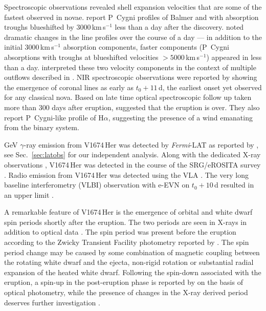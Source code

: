 \documentclass[a4paper,fleqn,usenatbib]{mnras}
\newcommand{\nova}{V1674\,Her}
\newcommand{\fermilat}{\emph{Fermi}-LAT}
\begin{document}
Spectroscopic observations revealed shell expansion velocities that are some of the fastest observed in novae. 
\citet{2021ATel14704....1M} report P~Cygni profiles of Balmer and 
 with absorption troughs blueshifted by 3000\,km\,s$^{-1}$ less than a day after the discovery. 
\citet{2021ATel14710....1A} noted dramatic changes in the line profiles over the course of a day --- in addition to 
the initial 3000\,km\,s$^{-1}$ absorption components, faster components (P~Cygni absorptions with troughs at blueshifted 
velocities $>5000$\,km\,s$^{-1}$) appeared in less than a day. 
\citet{2021ATel14710....1A} interpreted these two velocity components in the context of multiple outflows described in \citet{2020ApJ...905...62A}. 
NIR spectroscopic observations were reported by \cite{2021ApJ...922L..10W} showing the emergence of coronal lines as early
as $t_0 + 11$\,d, the earliest onset yet observed for any classical nova. 
Based on late time optical spectroscopic follow up taken more than 300 days after eruption, 
\cite{2022RNAAS...6..124W} suggested that the eruption is over. They also report
P~Cygni-like profile of H$\alpha$, suggesting the presence of a wind emanating from the binary system.

GeV $\gamma$-ray emission from \nova{} was detected by \fermilat{} as reported
by \cite{2021ATel14705....1L,2021ATel14707....1L,2022MNRAS.517L..97L}, see Sec.~\ref{sec:latobs} for our independent analysis.
Along with the dedicated X-ray observations \citep[][and Sec.~\ref{sec:nustarobs}]{2021ATel14747....1P,2021ApJ...922L..42D},
\nova{} was detected in the course of the SRG/eROSITA survey \citep{2021AstL...47..587G}. 
Radio emission from \nova{} was detected using the VLA 
\citep[][\S~\ref{sec:vla}, \S~\ref{sec:radiodiscussion}]{2021ATel14731....1S}.
The very long baseline interferometry (VLBI) observation with e-EVN on $t_0+10$\,d resulted in 
an upper limit \citep{2021ATel14758....1P}.

A remarkable feature of \nova{} is the emergence of orbital 
\citep[3.67\,h $=$ 0.153\,d;][]{2021PZ.....41....4S,2021JAVSO..49..257S} 
and white dwarf spin periods \citep[8.36\,min $=$ 0.00580\,d;][]{2021ATel14856....1P} 
shortly after the eruption. The two periods are seen in X-rays in addition to optical data 
\citep{2021ATel14776....1M,2021ATel14798....1P,2022ATel15317....1P,2022ApJ...932...45O,2022MNRAS.517L..97L}. 
The spin period was present before the eruption according to the Zwicky Transient Facility
photometry reported by \cite{2021ATel14720....1M}. 
The spin period change may be caused by some combination of 
magnetic coupling between the rotating white dwarf and the ejecta, 
non-rigid rotation or substantial radial expansion of the heated white dwarf. 
Following the spin-down associated with the eruption, a spin-up in the post-eruption 
phase is reported by \citep{2022ApJ...940L..56P} on the basis of optical photometry, 
while the presence of changes in the X-ray derived period deserves further
investigation \citep{2021ApJ...922L..42D,2022ApJ...932...45O}.
\end{document}
